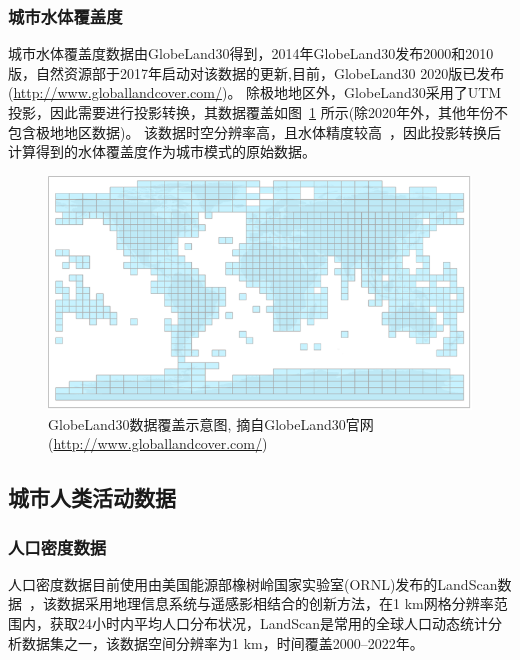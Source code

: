 \subsubsection{城市水体覆盖度}\label{城市水体覆盖度}
城市水体覆盖度数据由GlobeLand30得到，2014年GlobeLand30发布2000和2010版，自然资源部于2017年启动对该数据的更新,目前，GlobeLand30 2020版已发布 (\url{http://www.globallandcover.com/})。
除极地地区外，GlobeLand30采用了UTM投影，因此需要进行投影转换，其数据覆盖如图~\ref{fig:GlobeLand30数据覆盖示意图} 所示(除2020年外，其他年份不包含极地地区数据)。
该数据时空分辨率高，且水体精度较高~\citep{chen2015global}，因此投影转换后计算得到的水体覆盖度作为城市模式的原始数据。

{
  \begin{figure}[htbp]
    \centering
    \includegraphics{Figures/基础数据/GlobeLand30数据覆盖示意图.png}
    \captionsetup{justification=centering}
    \caption[GlobeLand30数据覆盖示意图]{GlobeLand30数据覆盖示意图, 摘自GlobeLand30官网(\url{http://www.globallandcover.com/})}
    \label{fig:GlobeLand30数据覆盖示意图}
  \end{figure}
}


\subsection{城市人类活动数据}\label{城市人类活动数据}

\subsubsection{人口密度数据}\label{人口密度数据}
人口密度数据目前使用由美国能源部橡树岭国家实验室(ORNL)发布的LandScan数据~\citep{brightLandScanGlobal20002001}，该数据采用地理信息系统与遥感影相结合的创新方法，在1 km网格分辨率范围内，获取24小时内平均人口分布状况，LandScan是常用的全球人口动态统计分析数据集之一，该数据空间分辨率为1 km，时间覆盖2000--2022年。

